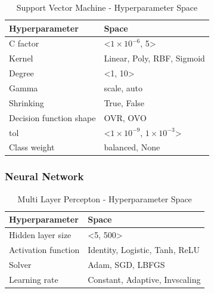 \begin{table}[H]
    \small
    \setlength{\tabcolsep}{8pt}
    \renewcommand{\arraystretch}{1.3}
    \centering
        \caption[Support Vector Machine - Hyperparameter Space]{Support Vector Machine - Hyperparameter Space}\label{tab:svmspace}
        \begin{tabular}{ll}
    \toprule
    \textbf{Hyperparameter} & \textbf{Space}\\
    \midrule
    \hline
    C factor & <$1\times 10^{-6}$, 5> \\
    Kernel & Linear, Poly, RBF, Sigmoid \\
    Degree & <1, 10> \\
    Gamma & scale, auto \\
    Shrinking & True, False \\
    Decision function shape & OVR, OVO \\
    tol & <$1\times 10^{-9}$, $1\times 10^{-3}$> \\
    Class weight & balanced, None \\
    \hline
    \bottomrule
    \end{tabular}
    \vspace{0.7em}

    \vspace{-1em}
\end{table}


\subsubsection{Neural Network}

\begin{table}[H]
    \small
    \setlength{\tabcolsep}{8pt}
    \renewcommand{\arraystretch}{1.3}
    \centering
        \caption[Multi Layer Percepton - Hyperparameter Space]{Multi Layer Percepton - Hyperparameter Space}\label{tab:mlpspace}
        \begin{tabular}{ll}
    \toprule
    \textbf{Hyperparameter} & \textbf{Space}\\
    \midrule
    \hline
    Hidden layer size & <5, 500> \\
    Activation function & Identity, Logistic, Tanh, ReLU \\
    Solver & Adam, SGD, LBFGS \\
    Learning rate & Constant, Adaptive, Invscaling \\
    \hline
    \bottomrule
    \end{tabular}
    \vspace{0.7em}

    \vspace{-1em}
\end{table}

